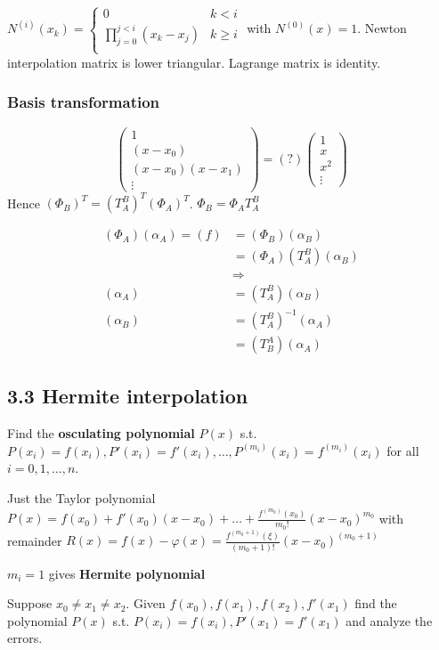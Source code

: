 \documentclass[11pt]{article}
\begin{document}
\(N^{(i)}(x_k)=\begin{cases}
    0&k<i\\
    \prod_{j=0}^{j<i}(x_k-x_j)&k\ge i\\
    \end{cases}\) with \(N^{(0)}(x) = 1\).
Newton interpolation matrix is lower triangular.
Lagrange matrix is identity.
\subsubsection{Basis transformation}
\label{sec:org0b8f5f0}
\begin{equation*}
\begin{pmatrix}
1\\
(x-x_0)\\
(x-x_0)(x-x_1)\\
\vdots
\end{pmatrix}=(?)
\begin{pmatrix}
1\\
x\\
x^2\\
\vdots
\end{pmatrix}
\end{equation*}
Hence \((\Phi_B)^T=(T_A^B)^T(\Phi_A)^T\).
\(\Phi_B=\Phi_AT_A^B\)

\begin{align*}
(\Phi_A)(\alpha_A)=(f)&=(\Phi_B)(\alpha_B)\\
&=(\Phi_A)(T_A^B)(\alpha_B)\\
&\Rightarrow\\
(\alpha_A)&=(T_A^B)(\alpha_B)\\
(\alpha_B)&=(T_A^B)^{-1}(\alpha_A)\\
&=(T_B^A)(\alpha_A)
\end{align*}
\subsection{3.3 Hermite interpolation}
\label{sec:org67298f3}
Find the \textbf{osculating polynomial} \(P(x)\) s.t. \(P(x_i)=f(x_i),
   P'(x_i)=f'(x_i),\dots,P^{(m_i)}(x_i)=f^{(m_i)}(x_i)\) for all \(i=0,1,\dots,n\).

Just the Taylor polynomial \(P(x)=f(x_0)+f'(x_0)(x-x_0)+\dots+
   \frac{f^{(m_0)}(x_0)}{m_0!}(x-x_0)^{m_0}\) with remainder 
\(R(x)=f(x)-\varphi(x)=\frac{f^{(m_0+1)}(\xi)}{(m_0+1)!}(x-x_0)^{(m_0+1)}\)

\(m_i = 1\) gives \textbf{Hermite polynomial}

\begin{example}
Suppose $x_0\neq x_1\neq x_2$. Given $f(x_0),f(x_1), f(x_2),
f'(x_1)$ find the polynomial $P(x)$ s.t. $P(x_i)=f(x_i),P'(x_1)=f'(x_1)$ and
analyze the errors.
\end{example}
\end{document}
